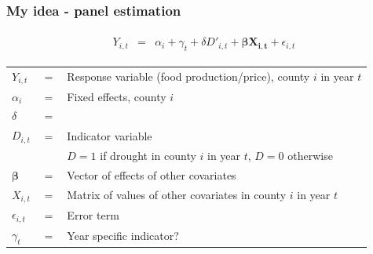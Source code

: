\documentclass{beamer}              %
\begin{document}
\begin{frame}

\frametitle{My idea - panel estimation}\label{MySuggestion4} 


\begin{align*}
\begin{array}{lcl}
 Y_{i,t} &=& \alpha_i +\gamma_t + \delta D'_{i,t} +  \boldsymbol{\beta X_{i,t}}+ \epsilon_{i,t}
\end{array}
\end{align*}

\begin{table}
\begin{small}
\begin{tabular}{lll}

$Y_{i,t}$ &$=$& Response variable (food production/price), county $i$ in year $t$\\
$\alpha_i$ &$=$& Fixed effects, county $i$\\
{\color{darkblue}$\delta$ }&{\color{darkblue}$=$}&{\color{darkblue}{Effect of drought on economy}}\\
$D_{i,t}$ &$=$& Indicator variable\\
& &  $D=1$ if drought in county $i$ in year $t$, $D=0$ otherwise\\
$\boldsymbol{\beta}$ &$=$& Vector of effects of other covariates\\
$X_{i,t}$ &$=$& Matrix of values of other covariates in county $i$ in year $t$\\
$\epsilon_{i,t}$ &$=$& Error term \\
{\color{DarkGreen}$\gamma_t$} & {\color{DarkGreen}$=$}& {\color{DarkGreen}Year specific indicator?}
\end{tabular}
\end{small}
\end{table}

\end{frame}







\section*{}



\end{document}

